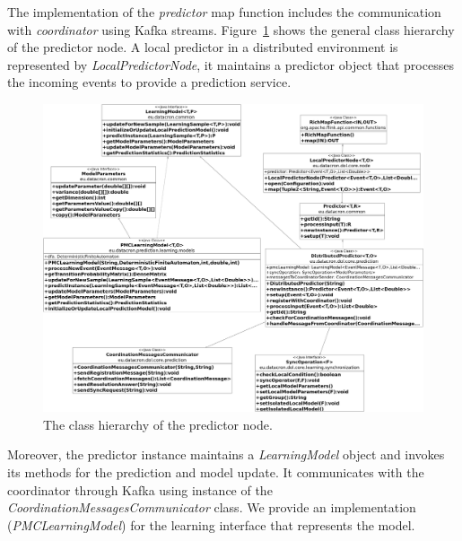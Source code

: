 \par The implementation of the \textit{predictor} map function includes the communication  with \textit{coordinator} using Kafka streams.
Figure~\ref{fig:class_diagram} shows the general class hierarchy of the predictor node. A local predictor in a distributed environment is represented by \textit{LocalPredictorNode}, it maintains a predictor object that processes the incoming events to provide a prediction service. 

 
 \begin{figure}[H]
 	\centering
 	\includegraphics[width=\textwidth,height=\linewidth]{chapters/figures/predictor_diagram.png}
 	
 	\caption{The class hierarchy of the predictor node.}
 	\label{fig:class_diagram}
 \end{figure}
\par Moreover, the predictor instance maintains a \textit{LearningModel} object and invokes its methods for the prediction and model update. It communicates with the coordinator through Kafka using instance of the \textit{CoordinationMessagesCommunicator} class. We provide an implementation (\textit{PMCLearningModel}) for the learning interface that represents the \pmcmr model. 

